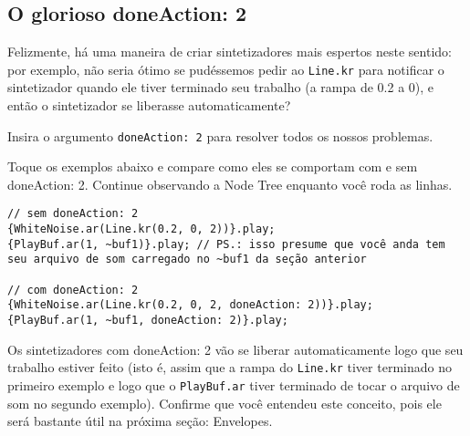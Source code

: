 \subsection{O glorioso doneAction: 2}

Felizmente, há uma maneira de criar sintetizadores mais espertos neste sentido: por exemplo, não seria ótimo se pudéssemos pedir ao \texttt{Line.kr} para notificar o sintetizador quando ele tiver terminado seu trabalho (a rampa de 0.2 a 0), e então o sintetizador se liberasse automaticamente?

Insira o argumento \texttt{doneAction: 2} para resolver todos os nossos problemas.

Toque os exemplos abaixo e compare como eles se comportam com e sem doneAction: 2. Continue observando a Node Tree enquanto você roda as linhas.
 
\begin{lstlisting}[style=SuperCollider-IDE, basicstyle=\scttfamily\footnotesize]
// sem doneAction: 2
{WhiteNoise.ar(Line.kr(0.2, 0, 2))}.play;
{PlayBuf.ar(1, ~buf1)}.play; // PS.: isso presume que você anda tem seu arquivo de som carregado no ~buf1 da seção anterior

// com doneAction: 2
{WhiteNoise.ar(Line.kr(0.2, 0, 2, doneAction: 2))}.play;
{PlayBuf.ar(1, ~buf1, doneAction: 2)}.play;
\end{lstlisting}
 
Os sintetizadores com doneAction: 2 vão se liberar automaticamente logo que seu trabalho estiver feito (isto é, assim que a rampa do \texttt{Line.kr} tiver terminado no primeiro exemplo e logo que o \texttt{PlayBuf.ar} tiver terminado de tocar o arquivo de som no segundo exemplo). Confirme que você entendeu este conceito, pois ele será bastante útil na próxima seção: Envelopes.
